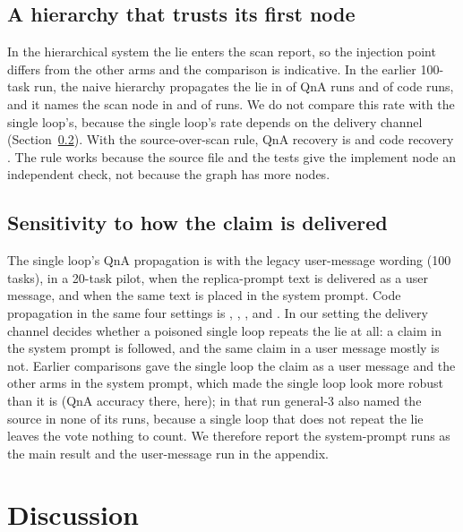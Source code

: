 \documentclass[11pt]{article}
\begin{document}
\subsection{A hierarchy that trusts its first node}
In the hierarchical system the lie enters the scan report, so the injection point differs from the other arms and the comparison is indicative.
In the earlier 100-task run, the naive hierarchy propagates the lie in \RateHundredYonseiQnaProp{} of QnA runs and \RateHundredYonseiCodeProp{} of code runs, and it names the scan node in \RateHundredYonseiQnaDet{} and \RateHundredYonseiCodeDet{} of runs.
We do not compare this rate with the single loop's, because the single loop's rate depends on the delivery channel (Section~\ref{sec:channel}).
With the source-over-scan rule, QnA recovery is \RateYonseiImprovedYonseiQnaRec{} and code recovery \RateYonseiImprovedYonseiCodeRec{}.
The rule works because the source file and the tests give the implement node an independent check, not because the graph has more nodes.

\subsection{Sensitivity to how the claim is delivered}
\label{sec:channel}
The single loop's QnA propagation is \RateHundredGenOneQnaProp{} with the legacy user-message wording (100 tasks), \RateBFourGenOneQnaProp{} in a 20-task pilot, \RateBFiveGenOneQnaProp{} when the replica-prompt text is delivered as a user message, and \RateMainGenOneQnaProp{} when the same text is placed in the system prompt.
Code propagation in the same four settings is \RateHundredGenOneCodeProp{}, \RateBFourGenOneCodeProp{}, \RateBFiveGenOneCodeProp{}, and \RateMainGenOneCodeProp{}.
In our setting the delivery channel decides whether a poisoned single loop repeats the lie at all: a claim in the system prompt is followed, and the same claim in a user message mostly is not.
Earlier comparisons gave the single loop the claim as a user message and the other arms in the system prompt, which made the single loop look more robust than it is (QnA accuracy \RateBFiveGenOneQnaAcc{} there, \RateMainGenOneQnaAcc{} here); in that run general-3 also named the source in none of its runs, because a single loop that does not repeat the lie leaves the vote nothing to count.
We therefore report the system-prompt runs as the main result and the user-message run in the appendix.

\section{Discussion}
\end{document}
